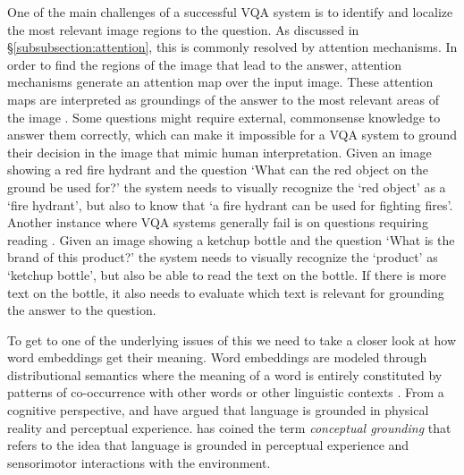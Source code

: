 \documentclass{article}
\begin{document}
One of the main challenges of a successful VQA system is to identify and localize the most relevant image regions to the question. As discussed in \S \ref{subsubsection:attention}, this is commonly resolved by attention mechanisms. In order to find the regions of the image that lead to the answer, attention mechanisms generate an attention map over the input image. These attention maps are interpreted as groundings of the answer to the most relevant areas of the image \citep{zhang2019interpretable}. Some questions might require external, commonsense knowledge to answer them correctly, which can make it impossible for a VQA system to ground their decision in the image that mimic human interpretation. Given an image showing a red fire hydrant and the question `What can the red object on the ground be used for?' the system needs to visually recognize the `red object' as a `fire hydrant', but also to know that `a fire hydrant can be used for fighting fires'. Another instance where VQA systems generally fail is on questions requiring reading \citep{singh2019towards}. Given an image showing a ketchup bottle and the question `What is the brand of this product?' the system needs to visually recognize the `product' as `ketchup bottle', but also be able to read the text on the bottle. If there is more text on the bottle, it also needs to evaluate which text is relevant for grounding the answer to the question.


To get to one of the underlying issues of this we need to take a closer look at how word embeddings get their meaning. Word embeddings are modeled through distributional semantics where the meaning of a word is entirely constituted by patterns of co-occurrence with other words or other linguistic contexts \citep{baroni2016grounding}. From a cognitive perspective, \citet{barsalou1999perceptual} and \citet{fincher2001perceptual} have argued that language is grounded in physical reality and perceptual experience. \citet{barsalou2008grounded} has coined the term \textit{conceptual grounding} that refers to the idea that language is grounded in perceptual experience and sensorimotor interactions with the environment.
\end{document}
